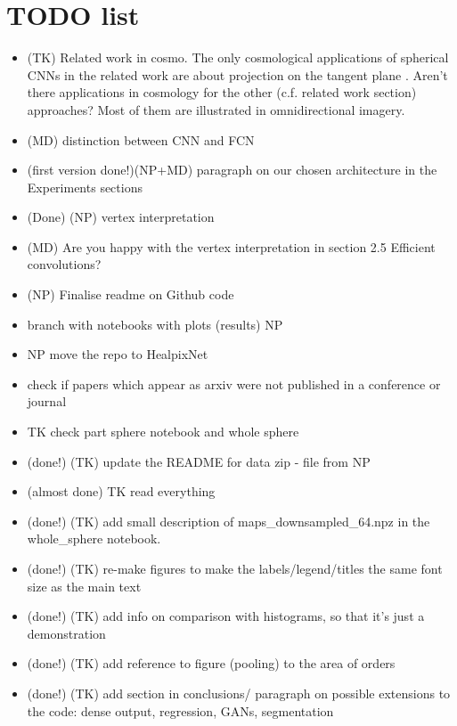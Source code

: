 \documentclass[final,twocolumn,3p,times,authoryear]{elsarticle}
\newcommand{\nati}[1]{{\color[rgb]{.1,.6,.1}{#1}}}
\newcommand{\1}{\b{1}}              %
\newcommand{\0}{\b{0}}              %
\begin{document}
\section*{TODO list}
\begin{itemize}[noitemsep,topsep=0pt,parsep=0pt,partopsep=0pt]
	\item (TK) Related work in cosmo. The only cosmological applications of spherical CNNs in the related work are about projection on the tangent plane \citep{schmelze2017cosmologicalmodel, fluri2018deep, gupta2018nongaussianinformation}. Aren't there applications in cosmology for the other (c.f. related work section) approaches? Most of them are illustrated in omnidirectional imagery.
	\item (MD) distinction between CNN and FCN
    \item (first version done!)(NP+MD) paragraph on our chosen architecture in the Experiments sections
    \item (Done) (NP) vertex interpretation
    \item (MD) Are you happy with the vertex interpretation in section 2.5 Efficient convolutions?
    \item (NP) Finalise readme on Github code
    \item branch with notebooks with plots (results) NP
    \item NP move the repo to HealpixNet
    \item check if papers which appear as arxiv were not published in a conference or journal
    \item TK check part sphere notebook and whole sphere
    \item (done!) (TK) update the README for data zip - file from NP
    \item (almost done) TK read everything
    \item (done!) (TK) add small description of maps\_downsampled\_64.npz in the whole\_sphere notebook. \nati{We need to talk about that.}
    \item (done!) (TK) re-make figures to make the labels/legend/titles the same font size as the main text
    \item (done!) (TK) add info on comparison with histograms, so that it's just a demonstration
    \item (done!) (TK) add reference to figure (pooling) to the area of orders
    \item (done!) (TK) add section in conclusions/ paragraph on possible extensions to the code: dense output, regression, GANs, segmentation

\end{itemize}
\end{document}
